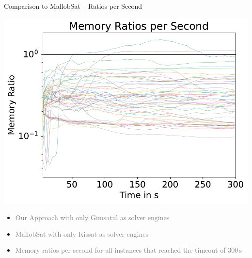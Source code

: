 \documentclass[]{sdqbeamer}
\begin{document}
\begin{frame}{Comparison to MallobSat -- Ratios per Second}
    \begin{minipage}{.45\textwidth}
        \includegraphics[scale=.8]{plots/16node_compare/mem_ratio_per_second.pdf}
    \end{minipage}
    \hfill
    \begin{minipage}{.45\textwidth}
        \begin{itemize}
            \item \textcolor{gray}{Our Approach with only Gimsatul as solver engines}
            \item \textcolor{gray}{MallobSat with only Kissat as solver engines}
            \item \textcolor{gray}{Memory ratios per second for all instances that reached the timeout of $300\,$s}
        \end{itemize}
    \end{minipage}    
\end{frame}
\end{document}
